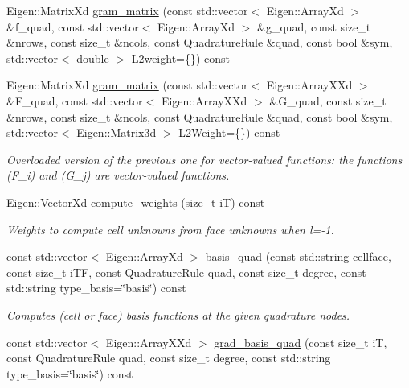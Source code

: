 \begin{DoxyCompactItemize}
Eigen\+::\+Matrix\+Xd \hyperlink{classHArDCore3D_1_1HybridCore_aa5c203c11a661933930a33335b0e2479}{gram\+\_\+matrix} (const std\+::vector$<$ Eigen\+::\+Array\+Xd $>$ \&f\+\_\+quad, const std\+::vector$<$ Eigen\+::\+Array\+Xd $>$ \&g\+\_\+quad, const size\+\_\+t \&nrows, const size\+\_\+t \&ncols, const Quadrature\+Rule \&quad, const bool \&sym, std\+::vector$<$ double $>$ L2weight=\{\}) const
\item 
Eigen\+::\+Matrix\+Xd \hyperlink{classHArDCore3D_1_1HybridCore_a7403a7f6890fc8ffae6f8dc531c1b397}{gram\+\_\+matrix} (const std\+::vector$<$ Eigen\+::\+Array\+X\+Xd $>$ \&F\+\_\+quad, const std\+::vector$<$ Eigen\+::\+Array\+X\+Xd $>$ \&G\+\_\+quad, const size\+\_\+t \&nrows, const size\+\_\+t \&ncols, const Quadrature\+Rule \&quad, const bool \&sym, std\+::vector$<$ Eigen\+::\+Matrix3d $>$ L2\+Weight=\{\}) const
\begin{DoxyCompactList}\small\item\em Overloaded version of the previous one for vector-\/valued functions\+: the functions (F\+\_\+i) and (G\+\_\+j) are vector-\/valued functions. \end{DoxyCompactList}\item 
\mbox{\label{classHArDCore3D_1_1HybridCore_a06825c5d156026d465a2798389aa952b}} 
Eigen\+::\+Vector\+Xd \hyperlink{classHArDCore3D_1_1HybridCore_a06825c5d156026d465a2798389aa952b}{compute\+\_\+weights} (size\+\_\+t iT) const
\begin{DoxyCompactList}\small\item\em Weights to compute cell unknowns from face unknowns when l=-\/1. \end{DoxyCompactList}\item 
const std\+::vector$<$ Eigen\+::\+Array\+Xd $>$ \hyperlink{classHArDCore3D_1_1HybridCore_af36cb92e3054b15c3b5b10fead49e925}{basis\+\_\+quad} (const std\+::string cellface, const size\+\_\+t i\+TF, const Quadrature\+Rule quad, const size\+\_\+t degree, const std\+::string type\+\_\+basis=\char`\"{}basis\char`\"{}) const
\begin{DoxyCompactList}\small\item\em Computes (cell or face) basis functions at the given quadrature nodes. \end{DoxyCompactList}\item 
const std\+::vector$<$ Eigen\+::\+Array\+X\+Xd $>$ \hyperlink{classHArDCore3D_1_1HybridCore_add794287f4bb49157a7b5f94a5ecb200}{grad\+\_\+basis\+\_\+quad} (const size\+\_\+t iT, const Quadrature\+Rule quad, const size\+\_\+t degree, const std\+::string type\+\_\+basis=\char`\"{}basis\char`\"{}) const

\end{DoxyCompactItemize}
